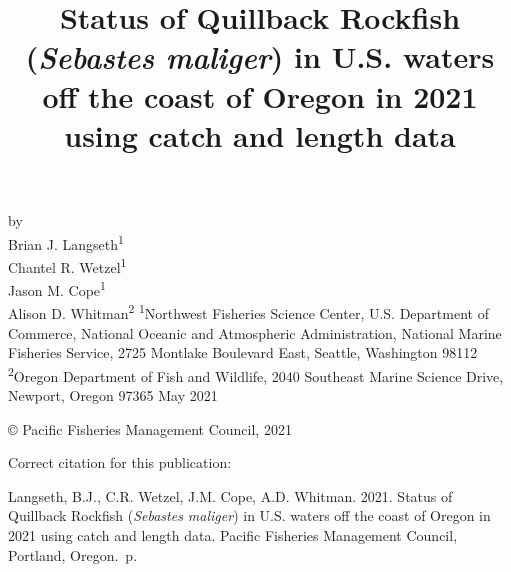 \documentclass[11pt,
  english,
  a4paper,
]{article}
\date{}
\newcommand{\trTitle}{Status of Quillback Rockfish (\emph{Sebastes maliger}) in U.S. waters off the coast of Oregon in 2021 using catch and length data}
\newcommand{\trYear}{2021}
\newcommand{\trMonth}{May}
\newcommand{\trAuthsBack}{Langseth, B.J., C.R. Wetzel, J.M. Cope, A.D. Whitman}
\newcommand{\trCitation}{
\begin{hangparas}{1em}{1}
\trAuthsBack{}. \trYear{}. \trTitle{}. Pacific Fisheries Management Council, Portland, Oregon. \pageref{LastPage}{}\,p.
\end{hangparas}}
\begin{document}

\renewcommand*{\thefootnote}{\fnsymbol{footnote}}

\small
\thispagestyle{empty}
\noindent
\begin{center}
\title{Status of Quillback Rockfish (\emph{Sebastes maliger}) in U.S. waters off the coast of Oregon in 2021 using catch and length data}
\vspace{1.5cm}
{\Large\textbf{}}
\vfill
by\\
Brian J. Langseth\textsuperscript{1}\\
Chantel R. Wetzel\textsuperscript{1}\\
Jason M. Cope\textsuperscript{1}\\
Alison D. Whitman\textsuperscript{2}\vfill
\textsuperscript{1}Northwest Fisheries Science Center, U.S. Department of Commerce, National Oceanic and Atmospheric Administration, National Marine Fisheries Service, 2725 Montlake Boulevard East, Seattle, Washington 98112\\
\textsuperscript{2}Oregon Department of Fish and Wildlife, 2040 Southeast Marine Science Drive, Newport, Oregon 97365\vfill
\trMonth{} \trYear{}
\end{center}
\clearpage

\thispagestyle{empty}
\vspace*{\fill}
\begin{center}
\copyright{} Pacific Fisheries Management Council, \trYear{}\\
\end{center}
\par
\bigskip
\noindent
Correct citation for this publication:
\bigskip
\par
\trCitation{}
\clearpage


\tableofcontents\clearpage
\listoffigures \listoftables \clearpage
\label{TRlastRoman}
\clearpage

\newpage
\thispagestyle{empty} %

\pagestyle{plain}  %
\renewcommand*{\thefootnote}{\arabic{footnote}}  %
\setcounter{footnote}{0}  %
\renewcommand{\headrulewidth}{0.5pt}
\renewcommand{\footrulewidth}{0.5pt}
\end{document}
